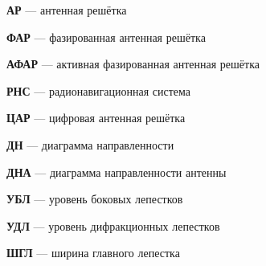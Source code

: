 
{
\noindent \textbf{АР} --- антенная решётка

\noindent \textbf{ФАР} --- фазированная антенная решётка

\noindent \textbf{АФАР} --- активная фазированная антенная решётка

\noindent \textbf{РНС} --- радионавигационная система

\noindent \textbf{ЦАР} --- цифровая антенная решётка

\noindent \textbf{ДН} --- диаграмма направленности

\noindent \textbf{ДНА} --- диаграмма направленности антенны

\noindent \textbf{УБЛ} --- уровень боковых лепестков

\noindent \textbf{УДЛ} --- уровень дифракционных лепестков

\noindent \textbf{ШГЛ} --- ширина главного лепестка
}